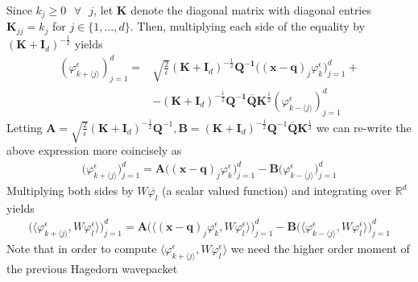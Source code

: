 Since $k_j \geq 0 \text{ } \forall \text{ } j$, let $\bm{K}$
denote the diagonal matrix with diagonal entries 
$\bm{K}_{jj} = k_j$ for $j \in \{1,...,d\}$.
Then, multiplying each side of the equality by 
$(\bm{K} + \bm{I}_d)^{-\frac{1}{2}}$ yields 
\begin{equation}
  \begin{split}
  \left( 
  \varphi^\epsilon_{k + \langle j \rangle} \right)_{j=1}^d
  =&
  \sqrt{\frac{2}{\epsilon}}
  (\bm{K} + \bm{I}_d)^{-\frac{1}{2}}\bm{Q^{-1}}
  \Big( (\bm{x} - \bm{q})_j \varphi_k^\epsilon \Big)_{j=1}^d 
  +
  \\
  &-
  (\bm{K} + \bm{I}_d)^{-\frac{1}{2}}
  \bm{Q^{-1}}\bm{\overline{Q}}
  \bm{K}^{\frac{1}{2}}
  \left( \varphi^\epsilon_{k - \langle j \rangle } \right)_{j=1}^d
  \end{split}
\end{equation}
Letting $\bm{A} = \sqrt{\frac{2}{\epsilon}}
(\bm{K} + \bm{I}_d)^{-\frac{1}{2}}\bm{Q}^{-1},
\bm{B} = (\bm{K} + \bm{I}_d)^{-\frac{1}{2}}
          \bm{Q}^{-1}\overline{\bm{Q}}
          \bm{K}^{\frac{1}{2}}$
we can re-write the above expression more coincisely as
\begin{equation}
  \begin{split}
    \Big(\varphi^\epsilon_{k + \langle j \rangle}\Big)_{j=1}^d
    =
    \bm{A} \Big( 
      (\bm{x} - \bm{q})_{j}\varphi^\epsilon_k
    \Big)_{j=1}^d
    - \bm{B} \Big(
      \varphi^\epsilon_{k - \langle j  \rangle}
      \Big)_{j=1}^d
  \end{split}
  \label{hag:dynamics:recurrence:relation:neat}
\end{equation}
Multiplying both sides by $W \overline{\varphi_l}$ 
(a scalar valued function) and 
integrating over $\mathbb{R}^d$ yields 
\begin{equation}
  \begin{split}
    \Big(
    \langle 
      \varphi^\epsilon_{k + \langle j \rangle}
      , W \varphi^\epsilon_l \rangle
    \Big)_{j=1}^d
    =
    \bm{A} \Big( 
      \langle (\bm{x} - \bm{q})_{j}\varphi^\epsilon_k
     , W \varphi^\epsilon_l \rangle
    \Big)_{j=1}^d
    - \bm{B} \Big(
      \langle 
      \varphi^\epsilon_{k - \langle j  \rangle}
      , W \varphi^\epsilon_l \rangle  
    \Big)_{j=1}^d
  \end{split}
  \label{hag:dynamics:recurrence:relation:inner:product}
\end{equation}
Note that in order to compute
$\langle \varphi^\epsilon_{k + \langle j \rangle}, W \varphi^\epsilon_l  \rangle$ 
we need the higher order moment of the previous Hagedorn wavepacket
